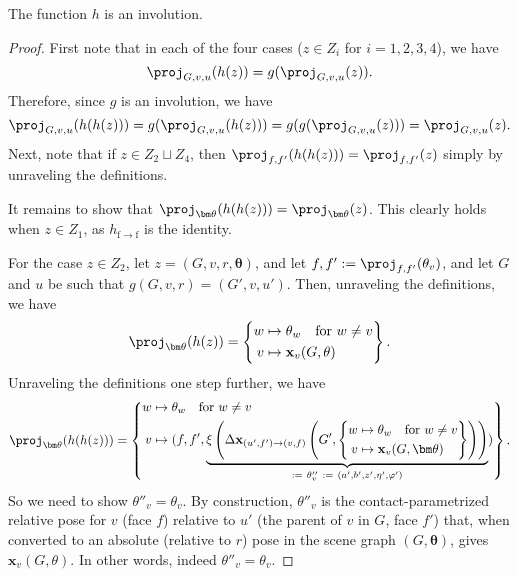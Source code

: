 \begin{proposition}
The function $h$ is an involution.
\end{proposition}
\begin{proof}
First note that in each of the four cases ($z \in Z_i$ for $i = 1,2,3,4$), we have
\[ \proj_{G,v,u}(h(z)) = g(\proj_{G,v,u}(z)). \]
Therefore, since $g$ is an involution, we have
\[ \proj_{G,v,u}(h(h(z))) = g(\proj_{G,v,u}(h(z))) = g(g(\proj_{G,v,u}(z))) = \proj_{G,v,u}(z).  \]
Next, note that if $z \in Z_2 \sqcup Z_4$, then $\proj_{f,f'}(h(h(z))) = \proj_{f,f'}(z)$ simply by unraveling the definitions.

It remains to show that $\proj_{\bm\theta}(h(h(z))) = \proj_{\bm\theta}(z)$.
This clearly holds when $z \in Z_1$, as $h_{\mathrm{f} \to \mathrm{f}}$ is the identity.

For the case $z \in Z_2$, let $z = (G, v, r, \bm\theta)$, and let $f, f' := \proj_{f,f'}(\theta_v)$, and let $G$ and $u$ be such that $g(G, v, r) = (G', v, u')$.
Then, unraveling the definitions, we have
\[
    \proj_{\bm\theta}(h(z)) = \left\{\begin{aligned}
        w &\mapsto \theta_w \quad\text{for $w \neq v$} \\
        v &\mapsto \mathbf{x}_v(G, \theta)
    \end{aligned}\right\}.
\]
Unraveling the definitions one step further, we have
\[
    \proj_{\bm\theta}(h(h(z))) = \left\{\begin{aligned}
        w &\mapsto \theta_w \quad\text{for $w \neq v$} \\
        v &\mapsto (f, f', \underbrace{\xi\left(
                \Delta\mathbf{x}_{(u', f') \to (v, f)}\left(
                    G',
                    \left\{\begin{aligned}
                        w &\mapsto \theta_w \quad\text{for $w \neq v$} \\
                        v &\mapsto \mathbf{x}_v(G, \bm\theta)
                    \end{aligned}\right\}
                \right)
        \right)}_{:=\ \theta''_v\ :=\ (a', b', z', \eta', \varphi')}
        )
    \end{aligned}\right\}.
\]
So we need to show $\theta''_v = \theta_v$.
By construction, $\theta''_v$ is the contact-parametrized relative pose for $v$ (face $f$) relative to $u'$ (the parent of $v$ in $G$, face $f'$) that, when converted to an absolute (relative to $r$) pose in the scene graph $(G, \bm\theta)$, gives $\mathbf{x}_v(G, \theta)$.
In other words, indeed $\theta''_v = \theta_v$.


\end{proof}
